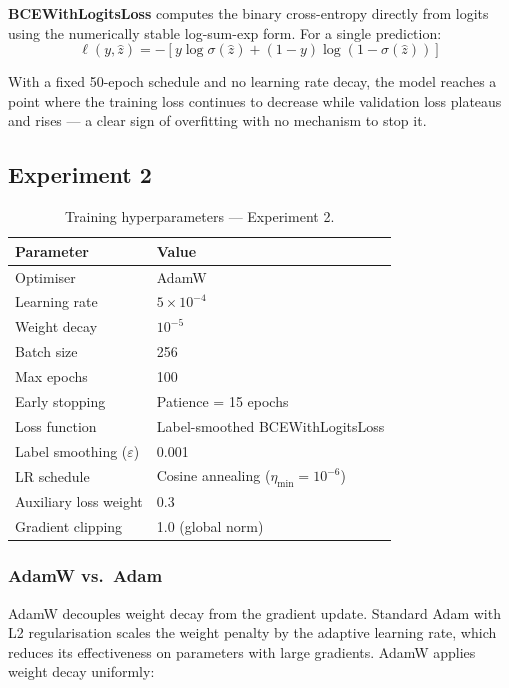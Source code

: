 \documentclass[12pt, a4paper]{article}
\begin{document}
\textbf{BCEWithLogitsLoss} computes the binary cross-entropy directly from logits using the numerically stable log-sum-exp form. For a single prediction:
\begin{equation}
\ell(y, \hat{z}) = -\left[y \log \sigma(\hat{z}) + (1-y) \log(1-\sigma(\hat{z}))\right]
\end{equation}

With a fixed 50-epoch schedule and no learning rate decay, the model reaches a point where the training loss continues to decrease while validation loss plateaus and rises — a clear sign of overfitting with no mechanism to stop it.

\subsection{Experiment 2}

\begin{table}[h!]
\centering
\caption{Training hyperparameters — Experiment 2.}
\begin{tabular}{ll}
\toprule
\textbf{Parameter} & \textbf{Value} \\
\midrule
Optimiser           & AdamW \\
Learning rate       & $5 \times 10^{-4}$ \\
Weight decay        & $10^{-5}$ \\
Batch size          & 256 \\
Max epochs          & 100 \\
Early stopping      & Patience = 15 epochs \\
Loss function       & Label-smoothed BCEWithLogitsLoss \\
Label smoothing ($\varepsilon$) & 0.001 \\
LR schedule         & Cosine annealing ($\eta_{\min} = 10^{-6}$) \\
Auxiliary loss weight & 0.3 \\
Gradient clipping   & 1.0 (global norm) \\
\bottomrule
\end{tabular}
\end{table}

\subsubsection{AdamW vs.\ Adam}

AdamW \cite{loshchilov2019decoupled} decouples weight decay from the gradient update. Standard Adam with L2 regularisation scales the weight penalty by the adaptive learning rate, which reduces its effectiveness on parameters with large gradients. AdamW applies weight decay uniformly:
\end{document}
